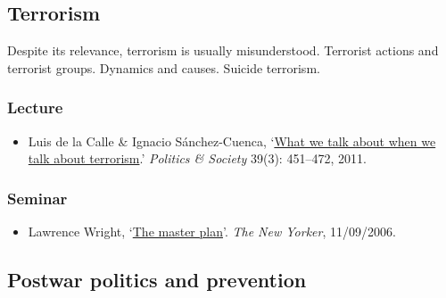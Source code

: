 \documentclass[12pt, a4paper]{article}
\begin{document}
\hline %

\subsection{Terrorism}\label{terrorism}

Despite its relevance, terrorism is usually misunderstood. Terrorist actions and terrorist groups. Dynamics and causes. Suicide terrorism.

\subsubsection*{Lecture}

\begin{itemize}
\setlength\itemsep{0pt}
\item Luis de la Calle \& Ignacio Sánchez-Cuenca, `\href{https://doi.org/10.1177/0032329211415506}{What we talk about when we talk about terrorism}.' \textit{Politics \& Society} 39(3): 451--472, 2011.
\end{itemize}

\subsubsection*{Seminar}

\begin{itemize}
\setlength\itemsep{0pt}
\item Lawrence Wright, `\href{https://www.newyorker.com/magazine/2006/09/11/the-master-plan}{The master plan}'. \textit{The New Yorker}, 11/09/2006.
\end{itemize}

\hline %

\subsection{Postwar politics and prevention}\label{postwar}
\end{document}
